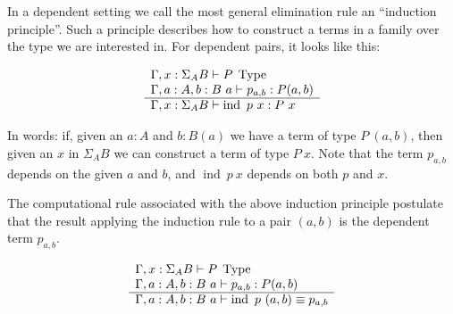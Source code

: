 In a dependent setting we call the most general elimination rule an ``induction
principle''. Such a principle describes how to construct a terms in a family
over the type we are interested in. For dependent pairs, it looks like this:

\begin{equation*}
  \begin{array}[t]{l}
    \Gamma, x : \Sigma_A B \vdash P \; \operatorname{Type}\\
    \Gamma, a : A, b : B~a \vdash p_{a,b} : P (a,b)\\
    \hline
    \Gamma, x : \Sigma_A B \vdash \operatorname{ind}~p~x : P~x
  \end{array}
\end{equation*}

In words: if, given an $a : A$ and $b : B (a)$ we have a term of type $P~(a,b)$,
then given an $x$ in $\Sigma_A B$ we can construct a term of type $P~x$. Note
that the term $p_{a,b}$ depends on the given $a$ and $b$, and $\operatorname{ind}~p~x$
depends on both $p$ and $x$.

The computational rule associated with the above induction principle postulate
that the result applying the induction rule to a pair $(a,b)$ is the dependent
term $p_{a,b}$.

\begin{equation*}
  \begin{array}[t]{l}
    \Gamma, x : \Sigma_A B \vdash P \; \operatorname{Type}\\
    \Gamma, a : A, b : B~a \vdash p_{a,b} : P (a,b)\\
    \hline
    \Gamma, a : A, b : B~a \vdash \operatorname{ind}~p~(a,b) \equiv p_{a,b}
  \end{array}
\end{equation*}


